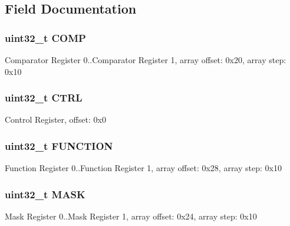 \subsection{Field Documentation}
\hypertarget{struct_d_w_t___mem_map_aa1352530035b6609791c19fda0cc2fb6}{}
\subsubsection[{C\+O\+M\+P}]{\setlength{\rightskip}{0pt plus 5cm}uint32\+\_\+t C\+O\+M\+P}\label{struct_d_w_t___mem_map_aa1352530035b6609791c19fda0cc2fb6}
Comparator Register 0..Comparator Register 1, array offset\+: 0x20, array step\+: 0x10 \hypertarget{struct_d_w_t___mem_map_a3be6514ca3bd369fd0de9f8f49471179}{}
\subsubsection[{C\+T\+R\+L}]{\setlength{\rightskip}{0pt plus 5cm}uint32\+\_\+t C\+T\+R\+L}\label{struct_d_w_t___mem_map_a3be6514ca3bd369fd0de9f8f49471179}
Control Register, offset\+: 0x0 \hypertarget{struct_d_w_t___mem_map_a4ae89e85dc3ace1cb39550b918afadd9}{}
\subsubsection[{F\+U\+N\+C\+T\+I\+O\+N}]{\setlength{\rightskip}{0pt plus 5cm}uint32\+\_\+t F\+U\+N\+C\+T\+I\+O\+N}\label{struct_d_w_t___mem_map_a4ae89e85dc3ace1cb39550b918afadd9}
Function Register 0..Function Register 1, array offset\+: 0x28, array step\+: 0x10 \hypertarget{struct_d_w_t___mem_map_a33f6052ebf71e72af18f19c6edadafc4}{}
\subsubsection[{M\+A\+S\+K}]{\setlength{\rightskip}{0pt plus 5cm}uint32\+\_\+t M\+A\+S\+K}\label{struct_d_w_t___mem_map_a33f6052ebf71e72af18f19c6edadafc4}
Mask Register 0..Mask Register 1, array offset\+: 0x24, array step\+: 0x10 \hypertarget{struct_d_w_t___mem_map_a631b6ac4a2a7ea845ce82f685d1e0d97}{}
